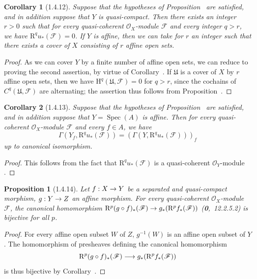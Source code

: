 \documentclass[oneside]{amsart}
\theoremstyle{ega-env-style}
\theoremstyle{ega-thm-env-style}
\newtheorem*{proposition}{Proposition}
\newtheorem*{corollary}{Corollary}
\theoremstyle{ega-defn-env-style}
\def\mathcal{\mathscr}
\def\sh{\mathcal}                   %
\def\HH{\mathrm{H}}                 %
\def\RR{\mathrm{R}}                 %
\def\Spec{\operatorname{Spec}}
\renewcommand{\to}{\mathchoice{\longrightarrow}{\rightarrow}{\rightarrow}{\rightarrow}}
\let\EGAOriginalLabel\label
\renewcommand{\label}[1]{\phantomsection\EGAOriginalLabel{#1}}
\begin{document}
\begin{corollary}[1.4.12]
\label{III.1.4.12}
Suppose that the hypotheses of Proposition~ are satisfied, and in addition suppose that $Y$ is quasi-compact.
Then there exists an integer $r>0$ such that for every quasi-coherent $\sh{O}_X$-module $\sh{F}$ and every integer $q>r$, we have $\RR^q u_*(\sh{F})=0$.
If $Y$ is affine, then we can take for $r$ an integer such that there exists a cover of $X$ consisting of $r$ affine open sets.
\end{corollary}

\begin{proof}
As we can cover $Y$ by a finite number of affine open sets, we can reduce to proving the second assertion, by virtue of Corollary~.
If $\mathfrak{U}$ is a cover of $X$ by $r$ affine open sets, then we have $\HH^q(\mathfrak{U},\sh{F})=0$ for $q>r$, since the cochains of $C^q(\mathfrak{U},\sh{F})$ are alternating; the assertion thus follows from Proposition~.
\end{proof}

\begin{corollary}[1.4.13]
\label{III.1.4.13}
Suppose that the hypotheses of Proposition~ are satisfied, and in addition suppose that $Y=\Spec(A)$ is affine.
Then for every quasi-coherent $\sh{O}_X$-module $\sh{F}$ and every $f\in A$, we have
\[
  \Gamma(Y_f,\RR^q u_*(\sh{F}))=(\Gamma(Y,\RR^q u_*(\sh{F})))_f
\]
up to canonical isomorphism.
\end{corollary}

\begin{proof}
This follows from the fact that $\RR^q u_*(\sh{F})$ is a quasi-coherent $\sh{O}_Y$-module .
\end{proof}

\begin{proposition}[1.4.14]
\label{III.1.4.14}
Let $f:X\to Y$ be a separated and quasi-compact morphism, $g:Y\to Z$ an affine morphism.
For every quasi-coherent $\sh{O}_X$-module $\sh{F}$, the canonical homomorphism $\RR^p(g\circ f)_*(\sh{F})\to g_*(\RR^p f_*(\sh{F}))$ (\textbf{0},~12.2.5.2) is bijective for all $p$.
\end{proposition}

\begin{proof}
For every affine open subset $W$ of $Z$, $g^{-1}(W)$ is an affine open subset of $Y$.
The homomorphism of presheaves defining the canonical homomorphism
\[
  \RR^p(g\circ f)_*(\sh{F})\to g_*(\RR^p f_*(\sh{F}))
\]
 is thus bijective by Corollary~.
\end{proof}
\end{document}
